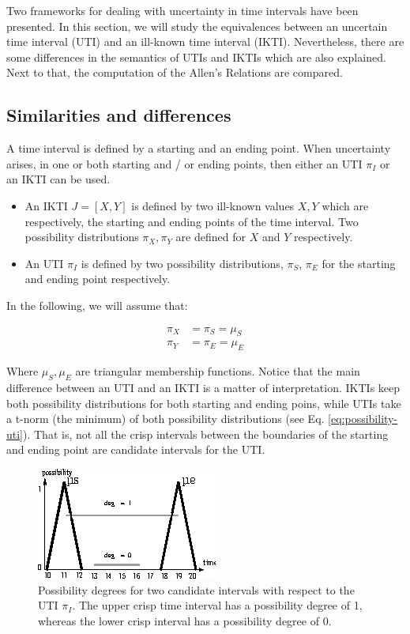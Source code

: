 Two frameworks for dealing with uncertainty in time intervals have been presented. In this section, we will study the equivalences between an uncertain time interval (UTI) and an ill-known time interval (IKTI). Nevertheless, there are some differences in the semantics of UTIs and IKTIs which are also explained. Next to that, the computation of the Allen's Relations are compared.

\subsection{\label{subsec:sim-dif}Similarities and differences}
A time interval is defined by a starting and an ending point. When uncertainty arises, in one or both starting and / or ending points, then either an UTI $\pi_I$ or an IKTI can be used. 

\begin{itemize}
 \item An IKTI $J = \left[X, Y \right]$ is defined by two ill-known values $X, Y$ which are respectively, the starting and ending points of the time interval. Two possibility distributions $\pi_X, \pi_Y$ are defined for $X$ and $Y$ respectively.
\item An UTI $\pi_I$ is defined by two possibility distributions, $\pi_S$, $\pi_E$ for the starting  and ending point respectively.
\end{itemize}

In the following, we will assume that:

\begin{align}
\pi_X &= \pi_S = \mu_S \\
\pi_Y &= \pi_E = \mu_E
\end{align}

Where $\mu_S, \mu_E$ are triangular membership functions. Notice that the main difference between an UTI and an IKTI is a matter of interpretation. IKTIs  keep both possibility distributions for both starting and ending poins, while UTIs take a t-norm (the minimum) of both possibility distributions (see Eq. \eqref{eq:possibility-uti}). That is, not all the crisp intervals between the boundaries of the starting and ending point are candidate intervals for the UTI.

\begin{figure}[h]
   \centering
   \includegraphics[scale=1.5]{graphs/equivalences.eps}
   \caption{Possibility degrees for two candidate intervals with respect to the UTI $\pi_I$. The upper crisp time interval has a possibility degree of 1, whereas the lower crisp interval has a possibility degree of 0. }
   \label{fig:ikc-greater}
 \end{figure}

